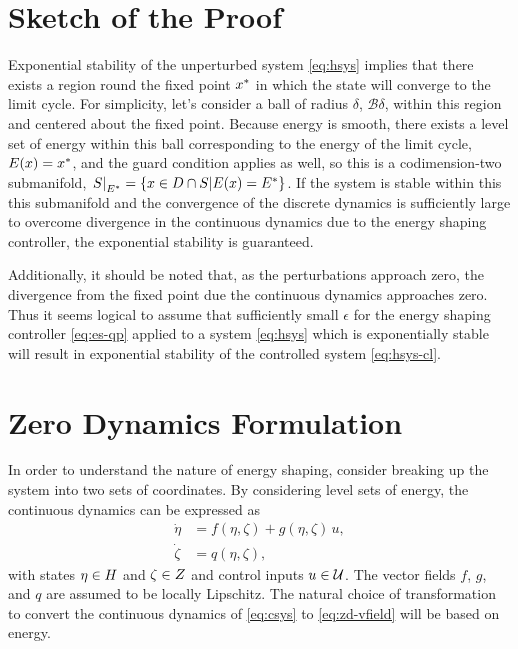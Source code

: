 \documentclass[twocolumn]{article}
\begin{document}
\section{Sketch of the Proof}

Exponential stability of the unperturbed system \eqref{eq:hsys} implies that there exists a region round the fixed point $x^{*}$ in which the state will converge to the limit cycle.
%
For simplicity, let's consider a ball of radius $\delta$, $\mathcal{B}\delta$, within this region and centered about the fixed point.
%
Because energy is smooth, there exists a level set of energy within this ball corresponding to the energy of the limit cycle, $E(x) = x^{*}$, and the guard condition applies as well, so this is a codimension-two submanifold, $\left.S\right|_{E^{*}} = \{ x \in D \cap S | E(x) = E^{*} \}$.
%
If the system is stable within this this submanifold and the convergence of the discrete dynamics is sufficiently large to overcome divergence in the continuous dynamics due to the energy shaping controller, the exponential stability is guaranteed.


Additionally, it should be noted that, as the perturbations approach zero, the divergence from the fixed point due the continuous dynamics approaches zero.
%
Thus it seems logical to assume that sufficiently small $\epsilon$ for the energy shaping controller \eqref{eq:es-qp} applied to a system \eqref{eq:hsys} which is exponentially stable will result in exponential stability of the controlled system \eqref{eq:hsys-cl}.

\newpage

\section{Zero Dynamics Formulation}

In order to understand the nature of energy shaping, consider breaking up the system into two sets of coordinates.
%
By considering level sets of energy, the continuous dynamics can be expressed as
\begin{align}
  \nonumber
  {\dot \eta} &= f(\eta, \zeta) + g(\eta, \zeta) \, u,\\
  {\dot \zeta} &= q(\eta, \zeta),
  \label{eq:zd-vfield}
\end{align}
%
with states $\eta \in H$ and $\zeta \in Z$ and control inputs $u \in \mathcal{U}$.
%
The vector fields $f$, $g$, and $q$ are assumed to be locally Lipschitz.
%
The natural choice of transformation to convert the continuous dynamics of \eqref{eq:csys} to \eqref{eq:zd-vfield} will be based on energy.
\end{document}
